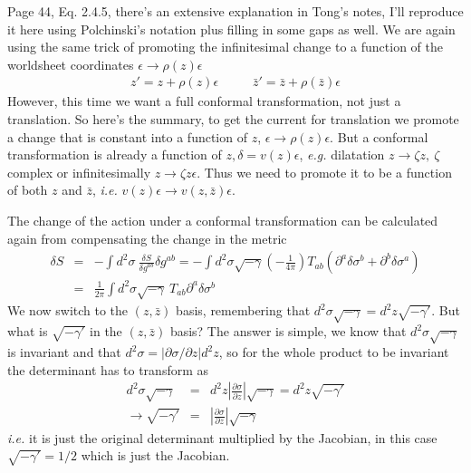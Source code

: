 \documentclass[aps,preprint,preprintnumbers,nofootinbib,showpacs,prd]{revtex4-1}
\newcommand{\ie}{{\it i.e.} }
\newcommand{\eg}{{\it e.g.} }
\newcommand{\nbea}{\begin{eqnarray*}}
\newcommand{\neea}{\end{eqnarray*}}
\begin{document}
Page 44, Eq. 2.4.5, there's an extensive explanation in Tong's notes, I'll reproduce it here using Polchinski's notation plus filling in some gaps as well. We are again using the same trick of promoting the infinitesimal change to a function of the worldsheet coordinates $\epsilon \rightarrow \rho(z)\epsilon$
%
\nbea
z' = z + \rho(z)\epsilon &~~~~~& \bar z' = \bar z + \rho(\bar z)\epsilon
\neea
%
However, this time we want a full conformal transformation, not just a translation. So here's the summary, to get the current for translation we promote a change that is constant into a function of $z$, $\epsilon \rightarrow \rho(z)\epsilon$. But a conformal transformation is already a function of $z, \delta = v (z)\epsilon$, \eg dilatation $z \rightarrow \zeta z, ~\zeta$ complex or infinitesimally $z \rightarrow \zeta z \epsilon$. Thus we need to promote it to be a function of both $z$ and $\bar z$, \ie $v(z)\epsilon \rightarrow v(z,\bar z) \epsilon$.

The change of the action under a conformal transformation can be calculated again from compensating the change in the metric
%
\nbea
\delta S & = & - \int d^2 \sigma ~ \frac{\delta S}{\delta g^{ab}} \delta g^{ab} = - \int d^2 \sigma  \sqrt{-\gamma} \left (-\frac{1}{4\pi} \right ) T_{ab} (\partial^a \delta \sigma^b + \partial^b \delta \sigma^a) \\
& = & \frac{1}{2\pi} \int d^2 \sigma \sqrt{-\gamma}  ~ T_{ab} \partial^a \delta \sigma^b
\neea
%
We now switch to the $(z, \bar z)$ basis, remembering that $d^2 \sigma \sqrt{-\gamma} = d^2 z \sqrt{-\gamma'}$. But what is $\sqrt{-\gamma'}$ in the $(z, \bar z)$ basis? The answer is simple, we know that $d^2 \sigma \sqrt{-\gamma}$ is invariant and that $d^2 \sigma = |\partial \sigma/\partial z| d^2z$, so for the whole product to be invariant the determinant has to transform as
%
\nbea
d^2 \sigma \sqrt{-\gamma} & = & d^2 z \left | \frac{\partial \sigma}{\partial z}\right | \sqrt{-\gamma} = d^2 z \sqrt{-\gamma'} \\
\rightarrow \sqrt{-\gamma'} & = & \left | \frac{\partial \sigma}{\partial z}\right | \sqrt{-\gamma}
\neea
%
\ie it is just the original determinant multiplied by the Jacobian, in this case $\sqrt{-\gamma'} = 1/2$ which is just the Jacobian.
\end{document}
